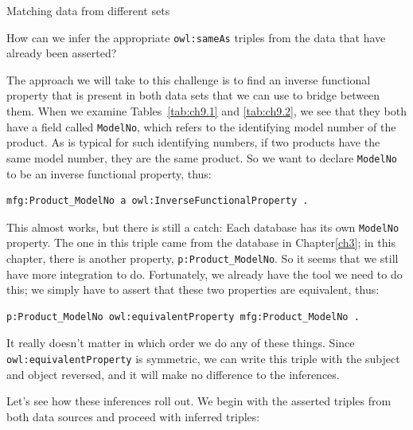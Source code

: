 \begin{challenge}{Matching data from different sets}

How can we infer the appropriate \texttt{owl:sameAs} triples from the data that
have already been asserted?

\solution

The approach we will take to this challenge is to find an inverse
functional property that is present in both data sets that we can use to
bridge between them. When we examine Tables~\ref{tab:ch9.1} and \ref{tab:ch9.2}, we see that
they both have a field called \texttt{ModelNo}, which refers to the identifying
model number of the product. As is typical for such identifying numbers,
if two products have the same model number, they are the same product.
So we want to declare \texttt{ModelNo} to be an inverse functional property,
thus:

\begin{lstlisting}
mfg:Product_ModelNo a owl:InverseFunctionalProperty .
\end{lstlisting}

This almost works, but there is still a catch: Each database has its own
\texttt{ModelNo} property. The one in this triple came from the database in
Chapter\ref{ch3}; in this chapter, there is another property,
\texttt{p:Product\_ModelNo}. So it seems that we still have more integration to
do. Fortunately, we already have the tool we need to do this; we simply
have to assert that these two properties are equivalent, thus:

\begin{lstlisting}
p:Product_ModelNo owl:equivalentProperty mfg:Product_ModelNo .
\end{lstlisting}

It really doesn't matter in which order we do any of these things. Since
\texttt{owl:equivalentProperty} is symmetric, we can write this triple with the
subject and object reversed, and it will make no difference to the
inferences.

Let's see how these inferences roll out. We begin with the asserted
triples from both data sources and proceed with inferred triples:


\end{challenge}
